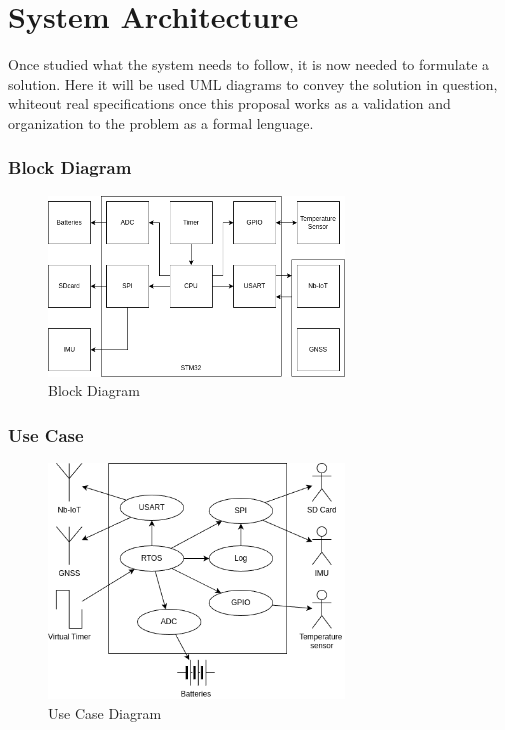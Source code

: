 \section{System Architecture}

Once studied what the system needs to follow, it is now needed to formulate a solution.
Here it will be used UML diagrams to convey the solution in question, whiteout real specifications
once this proposal works as a validation and organization to the problem as a formal lenguage.

\subsubsection{Block Diagram}

\begin{figure}[H]
    \centering
    \includegraphics[width=0.7\textwidth]{images/diagrams/block_diagram/block_diagram_1/block_diagram.drawio.png}  %
    \caption{Block Diagram}
    \label{fig:Block Diagram}        
\end{figure}

\subsubsection{Use Case}

\begin{figure}[H]
    \centering
    \includegraphics[width=0.7\textwidth]{images/diagrams/use_case/Use Case.drawio.png}  %
    \caption{Use Case Diagram}
    \label{fig:Use Case Diagram}        
\end{figure}

